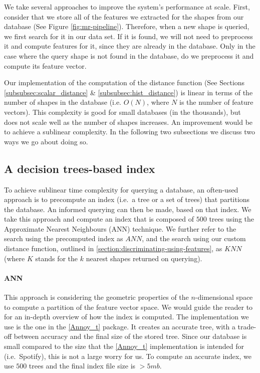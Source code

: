 We take several approaches to improve the system's performance at scale.
First, consider that we store all of the features we extracted for the shapes from our database (See Figure \ref{fig:mr-pipeline}).
Therefore, when a new shape is queried, we first search for it in our data set.
If it is found, we will not need to preprocess it and compute features for it, since they are already in the database.
Only in the case where the query shape is not found in the database, do we preprocess it and compute its feature vector.

Our implementation of the computation of the distance function (See Sections \ref{subsubsec:scalar_distance} \& \ref{subsubsec:hist_distance}) is linear in terms of the number
of shapes in the database (i.e. $O(N)$, where $N$ is the number of feature vectors).
This complexity is good for small databases (in the thousands), but does not scale well as the number of shapes increases.
An improvement would be to achieve a sublinear complexity.
In the following two subsections we discuss two ways we go about doing so.

\subsection{A decision trees-based index}
To achieve sublinear time complexity for querying a database, an often-used approach is to precompute an index (i.e.\ a tree or a set of trees) that partitions the database.
An informed querying can then be made, based on that index.
We take this approach and compute an index that is composed of $500$ trees using the Approximate Nearest Neighbours (ANN) technique.
We further refer to the search using the precomputed index as $ANN$, and the search using our custom distance function, outlined in \ref{section:discriminating-using-features}, as $KNN$ (where $K$ stands for the $k$ nearest shapes returned on querying).

\paragraph{ANN}
This approach is considering the geometric properties of the $n$-dimensional space to compute a partition of the feature vector space.
We would guide the reader to \cite{rp_trees, ann} for an in-depth overview of how the index is computed.
The implementation we use is the one in the \ref{Annoy_t} package.
It creates an accurate tree, with a trade-off between accuracy and the final size of the stored tree.
Since our database is small compared to the size that the \ref{Annoy_t} implementation is intended for (i.e.\ Spotify), this is not a large worry for us.
To compute an accurate index, we use $500$ trees and the final index file size is $>5mb$.


